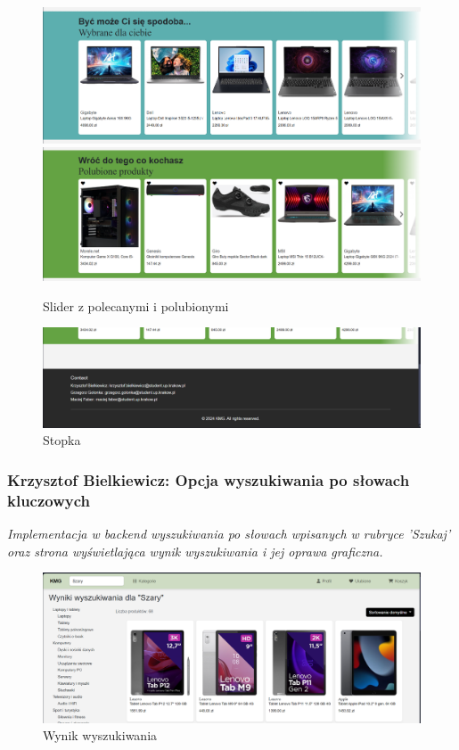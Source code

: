 \documentclass[12pt,a4paper,oneside]{article}
\theoremstyle{definition}
\numberwithin{equation}{section}
\begin{document}
    \begin{figure}[H]
        \centering
        \includegraphics[width=0.7\columnwidth]{images/krzysztofBImages/slider-polecane.png}
        \includegraphics[width=0.7\columnwidth]{images/krzysztofBImages/slider-ulubione.png}
        \caption{Slider z polecanymi i polubionymi}
    \end{figure}

    \begin{figure}[H]
        \centering
        \includegraphics[width=0.7\columnwidth]{images/krzysztofBImages/footer.png}
        \caption{Stopka}
    \end{figure}


\subsubsection{Krzysztof Bielkiewicz: Opcja wyszukiwania po słowach kluczowych}
\label{1.3.3}
\textit{Implementacja w backend wyszukiwania po słowach wpisanych w rubryce 'Szukaj'
oraz strona wyświetlająca wynik wyszukiwania i jej oprawa graficzna.}
\begin{figure}[H]
    \centering
    \includegraphics[width=0.8\columnwidth]{images/krzysztofBImages/wyszukiwanie.png}
    \caption{Wynik wyszukiwania}
\end{figure}
\end{document}
